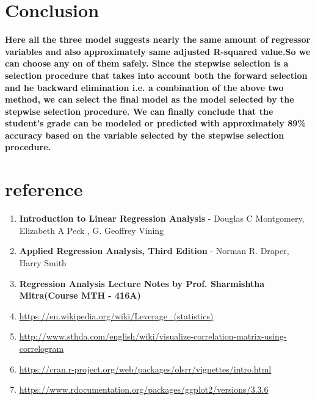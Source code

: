 \documentclass[A4paper,11pt]{report}
\begin{document}
	 \section{Conclusion}
	 \textbf{Here all the three model suggests nearly the same amount of regressor variables and also approximately same adjusted R-squared value.So we can choose any on of them safely. Since the stepwise selection is a selection procedure that takes into account both the forward selection and he backward elimination i.e. a combination of the above two method, we can select the final model as the model selected by the stepwise selection procedure.
	 	We can finally conclude that the student's grade can be modeled or predicted with approximately 89\% accuracy based on the variable selected by the stepwise selection procedure.
	 }
 \newpage
	 \section{reference}
	 \begin{enumerate}
	 	\item \textbf{Introduction to Linear Regression Analysis} - Douglas C Montgomery, Elizabeth A Peck , G. Geoffrey Vining
	 	\item \textbf{Applied Regression Analysis, Third Edition} - Norman R. Draper, Harry Smith
	 	\item \textbf{Regression Analysis Lecture Notes by Prof. Sharmishtha Mitra(Course MTH - 416A)}
	 	\item \url{https://en.wikipedia.org/wiki/Leverage_(statistics)}
	 	\item \url{http://www.sthda.com/english/wiki/visualize-correlation-matrix-using-correlogram}
	 	\item 
	 	\url{https://cran.r-project.org/web/packages/olsrr/vignettes/intro.html}
	 	\item \url{https://www.rdocumentation.org/packages/ggplot2/versions/3.3.6}
	 \end{enumerate}
	                                                                                                                                      
	 
	 
	 
	 
	 
	 
	 
	 
	 
	 
	 
	 
	 
	 
 
	
\end{document}
